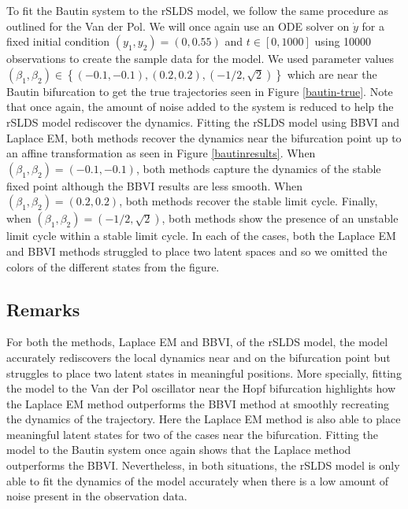 To fit the Bautin system to the rSLDS model, we follow the same procedure as outlined for the Van der Pol. We will once again use an ODE solver on $\dot{y}$ for a fixed initial condition $(y_1,y_2) = (0,0.55)$ and $t\in[0,1000]$ using 10000 observations to create the sample data for the model. We used parameter values $(\beta_1,\beta_2) \in \left\{(-0.1,-0.1),(0.2,0.2),\left(-1/2,\sqrt{2}\right)\right\}$ which are near the Bautin bifurcation to get the true trajectories seen in Figure \ref{bautin-true}. Note that once again, the amount of noise added to the system is reduced to help the rSLDS model rediscover the dynamics. Fitting the rSLDS model using BBVI and Laplace EM, both methods recover the dynamics near the bifurcation point up to an affine transformation as seen in Figure \ref{bautinresults}. When $(\beta_1,\beta_2) = (-0.1,-0.1)$, both methods capture the dynamics of the stable fixed point although the BBVI results are less smooth. When $(\beta_1,\beta_2) = (0.2,0.2)$, both methods recover the stable limit cycle. Finally, when $(\beta_1,\beta_2) = (-1/2,\sqrt{2})$, both methods show the presence of an unstable limit cycle within a stable limit cycle. In each of the cases, both the Laplace EM and BBVI methods struggled to place two latent spaces and so we omitted the colors of the different states from the figure.  

\subsection{Remarks}
For both the methods, Laplace EM and BBVI, of the rSLDS model, the model accurately rediscovers the local dynamics near and on the bifurcation point but struggles to place two latent states in meaningful positions. More specially, fitting the model to the Van der Pol oscillator near the Hopf bifurcation highlights how the Laplace EM method outperforms the BBVI method at smoothly recreating the dynamics of the trajectory. Here the Laplace EM method is also able to place meaningful latent states for two of the cases near the bifurcation. Fitting the model to the Bautin system once again shows that the Laplace method outperforms the BBVI. Nevertheless, in both situations, the rSLDS model is only able to fit the dynamics of the model accurately when there is a low amount of noise present in the observation data.

